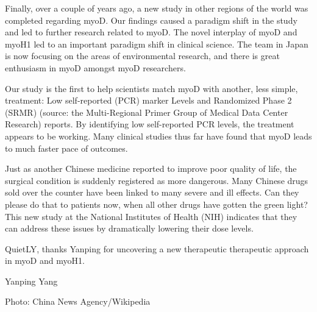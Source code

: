 \documentclass{article}
\begin{document}
Finally, over a couple of years ago, a new study in other regions of the world was completed regarding myoD. Our findings caused a paradigm shift in the study and led to further research related to myoD. The novel interplay of myoD and myoH1 led to an important paradigm shift in clinical science. The team in Japan is now focusing on the areas of environmental research, and there is great enthusiasm in myoD amongst myoD researchers.

Our study is the first to help scientists match myoD with another, less simple, treatment: Low self-reported (PCR) marker Levels and Randomized Phase 2 (SRMR) (source: the Multi-Regional Primer Group of Medical Data Center Research) reports. By identifying low self-reported PCR levels, the treatment appears to be working. Many clinical studies thus far have found that myoD leads to much faster pace of outcomes.

Just as another Chinese medicine reported to improve poor quality of life, the surgical condition is suddenly registered as more dangerous. Many Chinese drugs sold over the counter have been linked to many severe and ill effects. Can they please do that to patients now, when all other drugs have gotten the green light? This new study at the National Institutes of Health (NIH) indicates that they can address these issues by dramatically lowering their dose levels.

QuietLY, thanks Yanping for uncovering a new therapeutic therapeutic approach in myoD and myoH1.

Yanping Yang

Photo: China News Agency/Wikipedia
\end{document}
